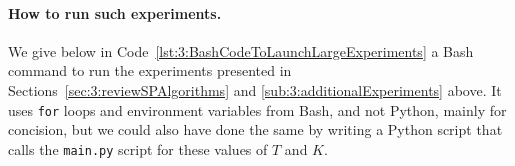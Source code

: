 




\paragraph{How to run such experiments.}
%
We give below in Code~\ref{lst:3:BashCodeToLaunchLargeExperiments} a Bash command to run the experiments presented in Sections~\ref{sec:3:reviewSPAlgorithms} and \ref{sub:3:additionalExperiments} above.
It uses \texttt{for} loops and environment variables from Bash, and not Python, mainly for concision,
but we could also have done the same by writing a Python script that calls the \texttt{main.py} script for these values of $T$ and $K$.

